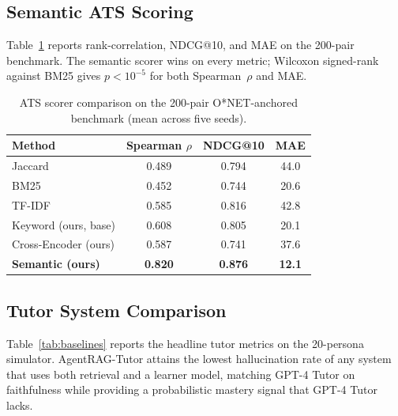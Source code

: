 \documentclass[conference]{IEEEtran}
\begin{document}
\subsection{Semantic ATS Scoring}
Table~\ref{tab:ats} reports rank-correlation, NDCG@10, and MAE on
the 200-pair benchmark. The semantic scorer wins on every metric;
Wilcoxon signed-rank against BM25 gives $p<10^{-5}$ for both
Spearman~$\rho$ and MAE.

\begin{table}[H]
\caption{ATS scorer comparison on the 200-pair O*NET-anchored
benchmark (mean across five seeds).}
\label{tab:ats}
\centering
\footnotesize
\setlength{\tabcolsep}{4pt}
\begin{tabular}{l c c c}
\toprule
Method & Spearman $\rho$ & NDCG@10 & MAE \\
\midrule
Jaccard                  & 0.489 & 0.794 & 44.0 \\
BM25                     & 0.452 & 0.744 & 20.6 \\
TF-IDF                   & 0.585 & 0.816 & 42.8 \\
Keyword (ours, base)     & 0.608 & 0.805 & 20.1 \\
Cross-Encoder (ours)     & 0.587 & 0.741 & 37.6 \\
\textbf{Semantic (ours)} & \textbf{0.820} & \textbf{0.876} & \textbf{12.1} \\
\bottomrule
\end{tabular}
\end{table}

\subsection{Tutor System Comparison}
Table~\ref{tab:baselines} reports the headline tutor metrics on the
20-persona simulator. AgentRAG-Tutor attains the lowest hallucination
rate of any system that uses both retrieval and a learner model,
matching GPT-4 Tutor on faithfulness while providing a probabilistic
mastery signal that GPT-4 Tutor lacks.
\end{document}
